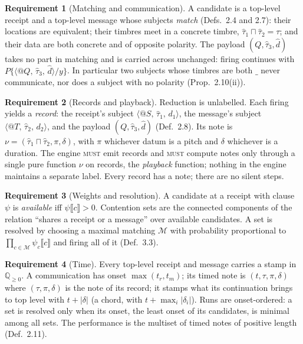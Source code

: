 \documentclass[11pt,a4paper]{article}
\makeatletter
\theoremstyle{definition}
\newtheorem{requirement}{Requirement}[section]
\theoremstyle{remark}
\newcommand{\Qnn}{\mathbb{Q}_{\geq 0}}
\newcommand{\nm}[3]{\langle @#1,\,#2,\,#3\rangle}
\newcommand{\len}[1]{|#1|}
\newcommand{\MUST}{\textsc{must}}
\newcommand{\wild}{\_}
\newcommand{\meet}{\sqcap}
\makeatother
\begin{document}
\begin{requirement}[Matching and communication]\label{req:comm}
A candidate is a top-level receipt and a top-level message whose subjects
\emph{match} (Defs.~2.4 and 2.7): their locations are equivalent; their timbres meet in a
concrete timbre, $\hat\tau_1 \meet \hat\tau_2 = \tau$; and their data are both
concrete and of opposite polarity. The payload $(Q,\hat\tau_3,\hat d)$ takes no
part in matching and is carried across unchanged: firing continues with
$P\{\nm{Q}{\hat\tau_3}{\hat d}/y\}$. In particular two subjects whose timbres
are both $\wild$ never communicate, nor does a subject with no polarity
(Prop.~2.10(ii)).
\end{requirement}

\begin{requirement}[Records and playback]\label{req:record}
Reduction is unlabelled. Each firing yields a \emph{record}: the receipt's
subject $\nm{S}{\hat\tau_1}{d_1}$, the message's subject
$\nm{T}{\hat\tau_2}{d_2}$, and the payload $(Q,\hat\tau_3,\hat d)$ (Def.~2.8).
Its note is $\nu = (\hat\tau_1\meet\hat\tau_2,\pi,\delta)$, with $\pi$ whichever
datum is a pitch and $\delta$ whichever is a duration. The engine \MUST{} emit
records and \MUST{} compute notes only through a single pure function
$\nu$ on records, the \emph{playback} function; nothing in the engine maintains a
separate label. Every record has a note; there are no silent steps.
\end{requirement}

\begin{requirement}[Weights and resolution]\label{req:resolve}
A candidate at a receipt with clause $\psi$ is \emph{available} iff
$\psi\llbracket c\rrbracket>0$. Contention sets are the connected components of
the relation ``shares a receipt or a message'' over available candidates. A set
is resolved by choosing a maximal matching $\mathcal M$ with probability
proportional to $\prod_{c\in\mathcal M}\psi_c\llbracket c\rrbracket$ and firing
all of it (Def.~3.3).
\end{requirement}

\begin{requirement}[Time]\label{req:time}
Every top-level receipt and message carries a stamp in $\Qnn$. A communication
has onset $\max(t_r,t_m)$; its timed note is $(t,\tau,\pi,\delta)$ where
$(\tau,\pi,\delta)$ is the note of its record; it stamps what its continuation
brings to top level with $t+\len{\delta}$ (a chord, with
$t+\max_i\len{\delta_i}$). Runs are onset-ordered: a set is resolved only when
its onset, the least onset of its candidates, is minimal among all sets. The
performance is the multiset of timed notes of positive length (Def.~2.11).
\end{requirement}
\end{document}
